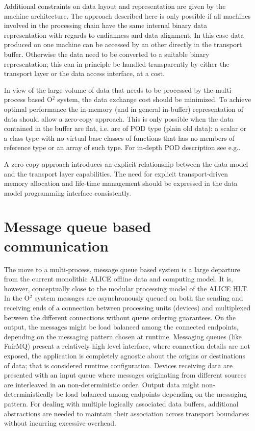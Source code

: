 \documentclass[a4paper,twoside]{article}
\def\O2{O$^2$}
\begin{document}
Additional constraints on data layout and representation are given by the machine architecture. The approach described here is only possible if all machines involved in the processing chain have the same internal binary data representation with regards to endianness and data alignment. In this case data produced on one machine can be accessed by an other directly in the transport buffer. Otherwise the data need to be converted to a suitable binary representation; this can in principle be handled transparently by either the transport layer or the data access interface, at a cost.

In view of the large volume of data that needs to be processed by the multi-process based \O2 system, the data exchange cost should be minimized. To achieve optimal performance the in-memory (and in general in-buffer) representation of data should allow a zero-copy approach. This is only possible when the data contained in the buffer are flat, i.e. are of POD type (plain old data): a scalar or a class type with no virtual base classes of functions that has no members of reference type or an array of such type. For in-depth POD description see e.g.\cite{POD}.

A zero-copy approach introduces an explicit relationship between the data model and the transport layer capabilities. The need for explicit transport-driven memory allocation and life-time management should be expressed in the data model programming interface consistently.

\section{Message queue based communication}
The move to a multi-process, message queue based system is a large departure from the current monolithic ALICE offline data and computing model. It is, however, conceptually close to the modular processing model of the ALICE HLT.
In the \O2 system messages are asynchronously queued on both the sending and receiving ends of a connection between processing units (devices) and multiplexed between the different connections without queue ordering guarantees. On the output, the messages might be load balanced among the connected endpoints, depending on the messaging pattern chosen at runtime.
Messaging queues (like FairMQ) present a relatively high level interface, where connection details are not exposed, the application is completely agnostic about the origins or destinations of data; that is considered runtime configuration.
Devices receiving data are presented with an input queue where messages originating from different sources are interleaved in an non-deterministic order. Output data might non-deterministically be load balanced among endpoints depending on the messaging pattern.
For dealing with multiple logically associated data buffers, additional abstractions are needed to maintain their association across transport boundaries without incurring excessive overhead.
\end{document}
